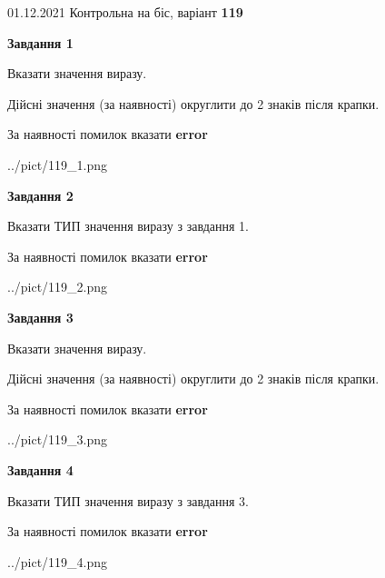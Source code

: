 \documentclass[11pt, ukrainian]{article}
\begin{document}
{01.12.2021 Контрольна на біс, варіант  \No \textbf { 119 }\par}
{
\begin {large}
{\begin {center}\textbf{Завдання 1}\end {center}}\par
Вказати значення виразу. \par
Дійсні значення (за наявності) округлити до 2 знаків після крапки. \par
За наявності помилок вказати \textbf{error}

\begin{center}
	{../pict/119_1.png}
\end{center}
\newpage

{\begin {center}\textbf{Завдання 2}\end {center}}\par
Вказати ТИП значення виразу з завдання 1. \par
За наявності помилок вказати \textbf{error}

\begin{center}
	{../pict/119_2.png}
\end{center}
\newpage

{\begin {center}\textbf{Завдання 3}\end {center}}\par
Вказати значення виразу. \par
Дійсні значення (за наявності) округлити до 2 знаків після крапки. \par
За наявності помилок вказати \textbf{error}

\begin{center}
	{../pict/119_3.png}
\end{center}
\newpage

{\begin {center}\textbf{Завдання 4}\end {center}}\par
Вказати ТИП значення виразу з завдання 3. \par
За наявності помилок вказати \textbf{error}

\begin{center}
	{../pict/119_4.png}
\end{center}
\newpage


\end{large}}
\end{document}
